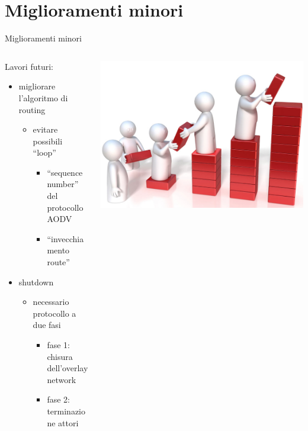 %
%
\section{Miglioramenti minori}
\begin{frame}{Miglioramenti minori}
	\begin{columns}
		\begin{column}{0.7\textwidth}
			Lavori futuri:
			\begin{itemize}
				\item{\footnotesize{migliorare l'algoritmo di routing}}
				\begin{itemize}
					\item{\scriptsize{evitare possibili ``loop''}}
					\begin{itemize}
						\item{\tiny{``sequence number'' del protocollo AODV}}
						\item{\tiny{``invecchiamento route''}}
					\end{itemize}
				\end{itemize}
				\item{\footnotesize{shutdown}}
				\begin{itemize}
					\item{\scriptsize{necessario protocollo a due fasi}}
					\begin{itemize}
						\item{\tiny{fase 1: chisura dell'overlay network}}
						\item{\tiny{fase 2: terminazione attori}}
					\end{itemize}
				\end{itemize}
			\end{itemize}
		\end{column}
		\begin{column}{0.3\textwidth}
			\centering
			\includegraphics[scale=0.2]{images/improvements.png}
		\end{column}
	\end{columns}
\end{frame}